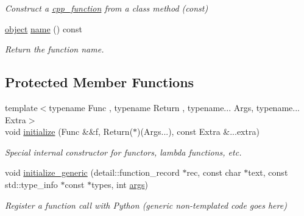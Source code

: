\begin{DoxyCompactItemize}
\begin{DoxyCompactList}\small\item\em Construct a \hyperlink{classcpp__function}{cpp\+\_\+function} from a class method (const) \end{DoxyCompactList}\item 
\hyperlink{classobject}{object} \hyperlink{classcpp__function_ad88d33284fad24595398adbff5f72303}{name} () const \hypertarget{classcpp__function_ad88d33284fad24595398adbff5f72303}{}\label{classcpp__function_ad88d33284fad24595398adbff5f72303}

\begin{DoxyCompactList}\small\item\em Return the function name. \end{DoxyCompactList}\end{DoxyCompactItemize}
\subsection*{Protected Member Functions}
\begin{DoxyCompactItemize}
\item 
{\footnotesize template$<$typename Func , typename Return , typename... Args, typename... Extra$>$ }\\void \hyperlink{classcpp__function_a211b5fdcdf73fe568adb28f6b1228bf1}{initialize} (Func \&\&f, Return($\ast$)(Args...), const Extra \&...extra)\hypertarget{classcpp__function_a211b5fdcdf73fe568adb28f6b1228bf1}{}\label{classcpp__function_a211b5fdcdf73fe568adb28f6b1228bf1}

\begin{DoxyCompactList}\small\item\em Special internal constructor for functors, lambda functions, etc. \end{DoxyCompactList}\item 
void \hyperlink{classcpp__function_a580bdd3520c1b489f1953915beac93f6}{initialize\+\_\+generic} (detail\+::function\+\_\+record $\ast$rec, const char $\ast$text, const std\+::type\+\_\+info $\ast$const $\ast$types, int \hyperlink{classargs}{args})\hypertarget{classcpp__function_a580bdd3520c1b489f1953915beac93f6}{}\label{classcpp__function_a580bdd3520c1b489f1953915beac93f6}

\begin{DoxyCompactList}\small\item\em Register a function call with Python (generic non-\/templated code goes here) \end{DoxyCompactList}\end{DoxyCompactItemize}
